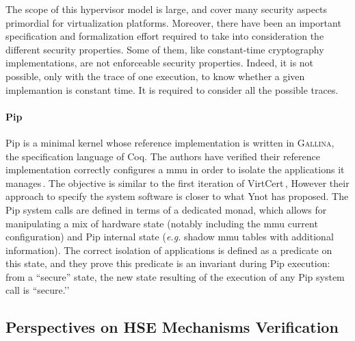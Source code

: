 The scope of this hypervisor model is large, and cover many security aspects
primordial for virtualization platforms.
%
Moreover, there have been an important specification and formalization effort
required to take into consideration the different security properties.
%
Some of them, like constant-time cryptography implementations, are not
enforceable security properties.
%
Indeed, it is not possible, only with the trace of one execution, to know
whether a given implemantion is constant time.
%
It is required to consider all the possible traces.

\paragraph{Pip}
%
Pip is a minimal kernel whose reference implementation is written in {\scshape
  Gallina}, the specification language of Coq.
%
The authors have verified their reference implementation correctly configures a
\ac{mmu} in order to isolate the applications it manages\,\cite{jomaa2016mmu}.
%
The objective is similar to the first iteration of
VirtCert\,\cite{barthe2011virtcert1}, However their approach to specify the
system software is closer to what Ynot has proposed.
%
The Pip system calls are defined in terms of a dedicated monad, which allows for
manipulating a mix of hardware state (notably including the \ac{mmu} current
configuration) and Pip internal state (\emph{e.g.} shadow \ac{mmu} tables with
additional information).
%
The correct isolation of applications is defined as a predicate on this state,
and they prove this predicate is an invariant during Pip execution:
%
from a ``secure'' state, the new state resulting of the execution of any Pip
system call is ``secure.’’

\subsection{Perspectives on HSE Mechanisms Verification}


